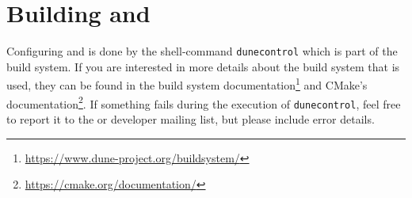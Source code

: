 %
%
%
%

\section{Building \Dune and \Dumux}
\label{buildIt}
Configuring \Dune and \Dumux is done by the shell-command \texttt{dunecontrol} which is part of the \Dune build system.
If you are interested in more details about the build system that is used,
they can be found in the \Dune build system documentation\footnote{\url{https://www.dune-project.org/buildsystem/}} and
CMake's documentation\footnote{\url{https://cmake.org/documentation/}}.
If something fails during the execution of \texttt{dunecontrol}, feel free to report it to the \Dune or \Dumux developer mailing list,
but please include error details.

